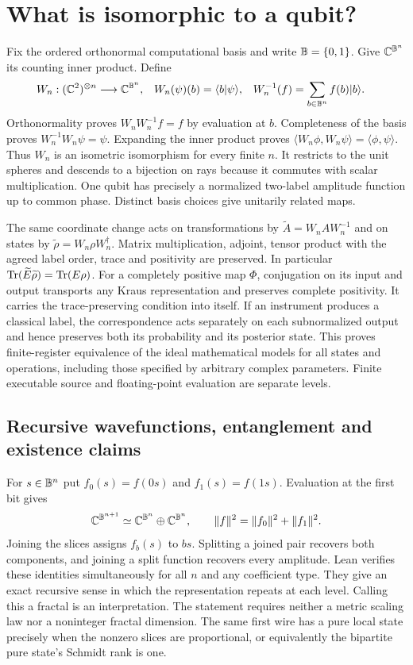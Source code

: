 \section{What is isomorphic to a qubit?}
\label{sec:math}
Fix the ordered orthonormal computational basis and write $\mathbb B=\{0,1\}$. Give $\mathbb C^{\mathbb B^n}$ its counting inner product. Define
\begin{align}
 W_n:(\mathbb C^2)^{\otimes n}&\longrightarrow\mathbb C^{\mathbb B^n},&
 W_n(\psi)(b)&=\langle b|\psi\rangle,&
 W_n^{-1}(f)&=\sum_{b\in\mathbb B^n}f(b)\lvert b\rangle . \label{eq:isometry}
\end{align}
Orthonormality proves $W_nW_n^{-1}f=f$ by evaluation at $b$. Completeness of the basis proves $W_n^{-1}W_n\psi=\psi$. Expanding the inner product proves $\langle W_n\phi,W_n\psi\rangle=\langle\phi,\psi\rangle$. Thus $W_n$ is an isometric isomorphism for every finite $n$. It restricts to the unit spheres and descends to a bijection on rays because it commutes with scalar multiplication. One qubit has precisely a normalized two-label amplitude function up to common phase. Distinct basis choices give unitarily related maps.

The same coordinate change acts on transformations by $\widetilde A=W_n A W_n^{-1}$ and on states by $\widetilde\rho=W_n\rho W_n^\dagger$. Matrix multiplication, adjoint, tensor product with the agreed label order, trace and positivity are preserved. In particular $\operatorname{Tr}(\widetilde E\widetilde\rho)=\operatorname{Tr}(E\rho)$. For a completely positive map $\Phi$, conjugation on its input and output transports any Kraus representation and preserves complete positivity. It carries the trace-preserving condition into itself. If an instrument produces a classical label, the correspondence acts separately on each subnormalized output and hence preserves both its probability and its posterior state. This proves finite-register equivalence of the ideal mathematical models for all states and operations, including those specified by arbitrary complex parameters. Finite executable source and floating-point evaluation are separate levels.

\subsection{Recursive wavefunctions, entanglement and existence claims}
For $s\in\mathbb B^n$ put $f_0(s)=f(0s)$ and $f_1(s)=f(1s)$. Evaluation at the first bit gives
\[
 \mathbb C^{\mathbb B^{n+1}}\simeq \mathbb C^{\mathbb B^n}\oplus\mathbb C^{\mathbb B^n},\qquad
 \|f\|^2=\|f_0\|^2+\|f_1\|^2 .
\]
Joining the slices assigns $f_b(s)$ to $bs$. Splitting a joined pair recovers both components, and joining a split function recovers every amplitude. Lean verifies these identities simultaneously for all $n$ and any coefficient type. They give an exact recursive sense in which the representation repeats at each level. Calling this a fractal is an interpretation. The statement requires neither a metric scaling law nor a noninteger fractal dimension. The same first wire has a pure local state precisely when the nonzero slices are proportional, or equivalently the bipartite pure state's Schmidt rank is one.

